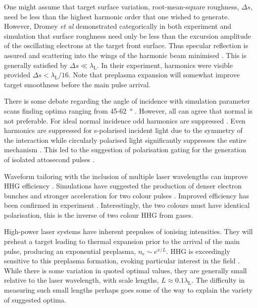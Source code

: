One might assume that target surface variation, root-mean-square roughness, $\Delta s$, need be less than the highest harmonic order that one wished to generate. However, Dromey \textit{et al} demonstrated categorically in both experiment and simulation that surface roughness need only be less than the excursion amplitude of the oscillating electrons at the target front surface. Thus specular reflection is assured and scattering into the wings of the harmonic beam minimised \cite{dromeyDiffractionlimitedPerformanceFocusing2009}. This is generally satisfied by $\Delta s \ll \lambda_\mathrm{L}$. In their experiment, harmonics were visible provided $\Delta s < \lambda_\mathrm{L}/16$. Note that preplasma expansion will somewhat improve target smoothness before the main pulse arrival. 

There is some debate regarding the angle of incidence with simulation parameter scans finding optima ranging from 45-\qty{62}{\degree} \cite{edwardsXRayEmissionEffectiveness2020, thauryHighorderHarmonicAttosecond2010, gonoskovUltrarelativisticNanoplasmonicsRoute2011}. However, all can agree that normal is not preferable. For ideal normal incidence odd harmonics are suppressed \cite{lichtersShortpulseLaserHarmonics1996}. Even harmonics are suppressed for s-polarised incident light due to the symmetry of the interaction \cite{dollarEnhancedLaserAbsorption2017} while circularly polarised light significantly suppresses the entire mechanism \cite{savinAttosecondscaleAbsorptionExtreme2017}. This led to the suggestion of polarisation gating for the generation of isolated attosecond pulses \cite{yeungDependenceLaserDrivenCoherent2014}. 

Waveform tailoring with the inclusion of multiple laser wavelengths can improve HHG efficiency \cite{edwardsWaveformControlledRelativisticHighOrderHarmonic2016}. Simulations have suggested the production of denser electron bunches and stronger acceleration for two colour pulses \cite{edwardsEnhancedAttosecondBursts2014}. Improved efficiency has been confirmed in experiment \cite{yeungExperimentalObservationAttosecond2017}. Interestingly, the two colours must have identical polarisation, this is the inverse of two colour HHG from gases.

High-power laser systems have inherent prepulses of ionising intensities. They will preheat a target leading to thermal expansion prior to the arrival of the main pulse, producing an exponential preplasma, $n_\mathrm{e} \sim e^{x/L}$. HHG is exceedingly sensitive to this preplasma formation, evoking particular interest in the field \cite{behmkeControllingSpacingAttosecond2011, rodelHarmonicGenerationRelativistic2012, dollarScalingHighorderHarmonic2013, kahalyDirectObservationDensityGradient2013, vincentiAchievingExtremeLight2019,behmkeControllingSpacingAttosecond2011}. While there is some variation in quoted optimal values, they are generally small relative to the laser wavelength, with scale lengths, $L \approx 0.1 \lambda_\mathrm{L}$. The difficulty in measuring such small lengths perhaps goes some of the way to explain the variety of suggested optima. 

